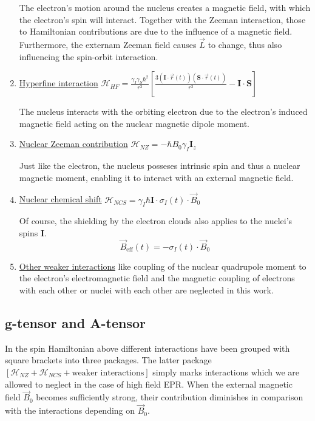\documentclass[11.5pt,a4paper]{article}
\begin{document}
\begin{enumerate}
  The electron's motion around the nucleus creates a magnetic field, with which the electron's spin will interact. 
  Together with the Zeeman interaction, those to Hamiltonian contributions are due to the influence of a magnetic field. Furthermore, the externam Zeeman field causes $\vec{L}$ to change, thus also influencing the spin-orbit interaction.

  \item \uline{Hyperfine interaction} $\mathcal{H}_{HF} = \frac{\gamma_I \gamma_S \hbar^2}{r^3} \left[ \frac{3 (\mathbf{I} \cdot \vec{r}(t) ) (\mathbf{S} \cdot \vec{r}(t) )}{r^2} - \mathbf{I} \cdot \mathbf{S} \right]$
   
  The nucleus interacts with the orbiting electron due to the electron's induced magnetic field acting on the nuclear magnetic dipole moment. 

  \item \uline{Nuclear Zeeman contribution} $\mathcal{H}_{NZ} = -\hbar B_0 \gamma_I \mathbf{I}_z$
  
  Just like the electron, the nucleus posseses intrinsic spin and thus a nuclear magnetic moment, enabling it to interact with an external magnetic field.

  \item \uline{Nuclear chemical shift} $\mathcal{H}_{NCS} = \gamma_I \hbar \mathbf{I} \cdot \sigma_I(t) \cdot \vec{B}_0$
  
  Of course, the shielding by the electron clouds also applies to the nuclei's spins $\mathbf{I}$.
  \begin{equation}
    \vec{B}_\text{eff}(t) = - \sigma_I(t) \cdot \vec{B}_0
  \end{equation}

  \item \uline{Other weaker interactions} like coupling of the nuclear quadrupole moment to the electron's electromagnetic field and the magnetic coupling of electrons with each other or nuclei with each other are neglected in this work.
\end{enumerate}

\subsection{g-tensor and A-tensor}
  In the spin Hamiltonian above different interactions have been grouped with square brackets into three packages. The latter package $\left[\mathcal{H}_{NZ} + \mathcal{H}_{NCS} + \text{weaker interactions}\right]$ simply marks interactions which we are allowed to neglect in the case of high field EPR. When the external magnetic field $\vec{B}_0$ becomes sufficiently strong, their contribution diminishes in comparison with the interactions depending on $\vec{B}_0$.
\end{document}
